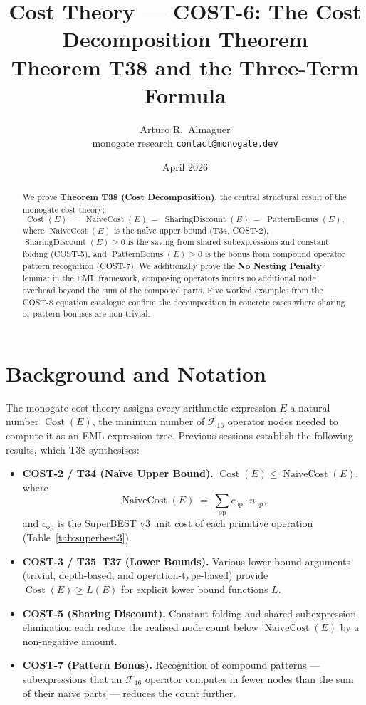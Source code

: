 \documentclass[12pt,a4paper]{article}
\title{Cost Theory --- COST-6: The Cost Decomposition Theorem\\[4pt]
       \large Theorem T38 and the Three-Term Formula}
\author{Arturo R.\ Almaguer\\
\small monogate research \quad \texttt{contact@monogate.dev}}
\date{April 2026}
\theoremstyle{definition}
\newcommand{\Cost}{\operatorname{Cost}}
\newcommand{\NC}{\operatorname{NaiveCost}}
\newcommand{\SD}{\operatorname{SharingDiscount}}
\newcommand{\PB}{\operatorname{PatternBonus}}
\begin{document}
\maketitle

\begin{abstract}
We prove \textbf{Theorem T38 (Cost Decomposition)}, the central structural
result of the monogate cost theory:
\[
  \Cost(E) \;=\; \NC(E) \;-\; \SD(E) \;-\; \PB(E),
\]
where $\NC(E)$ is the na\"{i}ve upper bound (T34, COST-2), $\SD(E) \geq 0$
is the saving from shared subexpressions and constant folding (COST-5), and
$\PB(E) \geq 0$ is the bonus from compound operator pattern recognition
(COST-7).  We additionally prove the \textbf{No Nesting Penalty} lemma:
in the EML framework, composing operators incurs no additional node overhead
beyond the sum of the composed parts.  Five worked examples from the COST-8
equation catalogue confirm the decomposition in concrete cases where sharing
or pattern bonuses are non-trivial.
\end{abstract}

\tableofcontents
\bigskip

\section{Background and Notation}
\label{sec:background}

The monogate cost theory assigns every arithmetic expression $E$ a natural
number $\Cost(E)$, the minimum number of $\mathcal{F}_{16}$ operator nodes
needed to compute it as an EML expression tree.
Previous sessions establish the following results, which T38 synthesises:

\begin{itemize}
  \item \textbf{COST-2 / T34 (Na\"{i}ve Upper Bound).}
        $\Cost(E) \leq \NC(E)$, where
        \[
          \NC(E) \;=\; \sum_{\mathrm{op}} c_{\mathrm{op}} \cdot n_{\mathrm{op}},
        \]
        and $c_{\mathrm{op}}$ is the SuperBEST v3 unit cost of each primitive
        operation (Table~\ref{tab:superbest3}).
  \item \textbf{COST-3 / T35--T37 (Lower Bounds).}
        Various lower bound arguments (trivial, depth-based, and
        operation-type-based) provide $\Cost(E) \geq L(E)$ for explicit
        lower bound functions $L$.
  \item \textbf{COST-5 (Sharing Discount).}
        Constant folding and shared subexpression elimination each reduce the
        realised node count below $\NC(E)$ by a non-negative amount.
  \item \textbf{COST-7 (Pattern Bonus).}
        Recognition of compound patterns --- subexpressions that an $\mathcal{F}_{16}$
        operator computes in fewer nodes than the sum of their na\"{i}ve
        parts --- reduces the count further.
\end{itemize}
\end{document}
